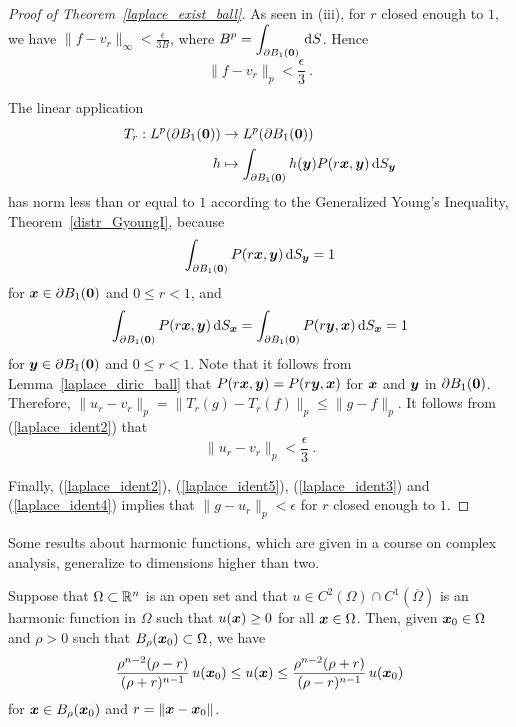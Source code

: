 \begin{proof}[Proof of Theorem~\ref{laplace_exist_ball}]
As seen in (iii), for $r$ closed enough to $1$, we have
$\displaystyle \| f - v_r \|_\infty < \frac{\epsilon}{3 B}$, where
$\displaystyle B^p = \int_{\partial B_1({\bm{0}})} \,\mathrm{d}{S}$.  Hence
\begin{equation} \label{laplace_ident3}
\| f - v_r \|_p < \frac{\epsilon}{3} \  . 
\end{equation}

The linear application
\begin{align*}
T_r: L^p(\partial B_1({\bm{0}})) &\rightarrow L^p(\partial B_1({\bm{0}})) \\
h &\mapsto \int_{\partial B_1({\bm{0}})} h({\bm{y}}) P(r{\bm{x}},{\bm{y}}) \,\mathrm{d}{S}_{{\bm{y}}}
\end{align*}
has norm less than or equal to $1$ according to the Generalized
Young's Inequality, Theorem~\ref{distr_GyoungI}, because
\[
  \int_{\partial B_1({\bm{0}})} P(r{\bm{x}},{\bm{y}}) \,\mathrm{d}{S}_{{\bm{y}}} = 1
\]
for ${\bm{x}} \in \partial B_1({\bm{0}})$ and $0 \leq r <1$, and
\[
\int_{\partial B_1({\bm{0}})} P(r{\bm{x}},{\bm{y}}) \,\mathrm{d}{S}_{{\bm{x}}} =
\int_{\partial B_1({\bm{0}})} P(r{\bm{y}},{\bm{x}}) \,\mathrm{d}{S}_{{\bm{x}}} = 1
\]
for ${\bm{y}} \in \partial B_1({\bm{0}})$ and $0 \leq r <1$.
Note that it follows from Lemma~\ref{laplace_diric_ball} that
$P(r{\bm{x}}, {\bm{y}}) = P(r{\bm{y}},{\bm{x}})$ for
${\bm{x}}$ and ${\bm{y}}$ in $\partial B_1({\bm{0}})$.
Therefore, $\displaystyle \| u_r - v_r \|_p
= \|T_r(g) - T_r(f) \|_p \leq \|g - f \|_p$.
It follows from (\ref{laplace_ident2}) that
\begin{equation} \label{laplace_ident4}
\| u_r - v_r \|_p < \frac{\epsilon}{3} \ .
\end{equation}

Finally, (\ref{laplace_ident2}), (\ref{laplace_ident5}),
(\ref{laplace_ident3}) and (\ref{laplace_ident4}) implies that
$\|g-u_r\|_p < \epsilon$ for $r$ closed enough to $1$.
\end{proof}

Some results about harmonic functions, which are given in a course on
complex analysis, generalize to dimensions higher than two.

\begin{theorem}
Suppose that $\Omega \subset \mathbb{R}^n$ is an open set and that
$u \in C^2(\Omega)\cap C^1(\overline{\Omega})$ is an harmonic function
in $\Omega$ such that $u({\bm{x}}) \geq 0$ for all ${\bm{x}} \in \Omega$.
Then, given ${\bm{x}}_0 \in \Omega$ and $\rho>0$ such that
$B_{\rho}({\bm{x}}_0) \subset \Omega$, we have
\[
\frac{\rho^{n-2}(\rho-r)}{(\rho+r)^{n-1}}\, u({\bm{x}}_0) \leq u({\bm{x}}) \leq
\frac{\rho^{n-2}(\rho+r)}{(\rho-r)^{n-1}}\, u({\bm{x}}_0)
\]
for ${\bm{x}} \in B_{\rho}({\bm{x}}_0)$ and $r=\|{\bm{x}}-{\bm{x}}_0\|$.
\end{theorem}

